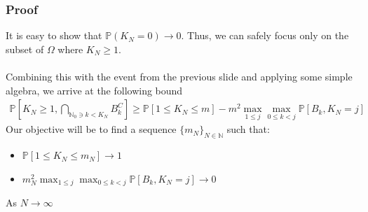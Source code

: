 \documentclass{beamer}
\begin{document}
\begin{frame}
    \frametitle{Proof}
    It is easy to show that $\mathbb{P}(K_N = 0) \rightarrow 0$. Thus, we can safely focus only on the subset of $\Omega$ where $K_N \geq 1$. \\~\\
    Combining this with the event from the previous slide and applying some simple algebra, we arrive at the following bound
    \begin{align*}
        \mathbb{P}\left[ K_N \geq 1,  \bigcap_{\mathbb{N}_0 \ni k < K_N}B_k^C \right]
         \geq  \mathbb{P}[1 \leq K_N \leq m] - m^2\max_{1 \leq j}\max_{0 \leq k < j}\mathbb{P}\left[ B_k, K_{N} = j \right]
    \end{align*}
    Our objective will be to find a sequence $\{m_N\}_{N\in\mathbb{N}}$ such that:
    \begin{itemize}
        \item $\mathbb{P}[1 \leq K_N \leq m_N] \rightarrow 1$
        \item $m_N^2\max_{1 \leq j}\max_{0 \leq k < j}\mathbb{P}\left[ B_k, K_{N} = j \right] \rightarrow 0$ 
    \end{itemize}
    As $N \rightarrow \infty$
\end{frame}
\end{document}
